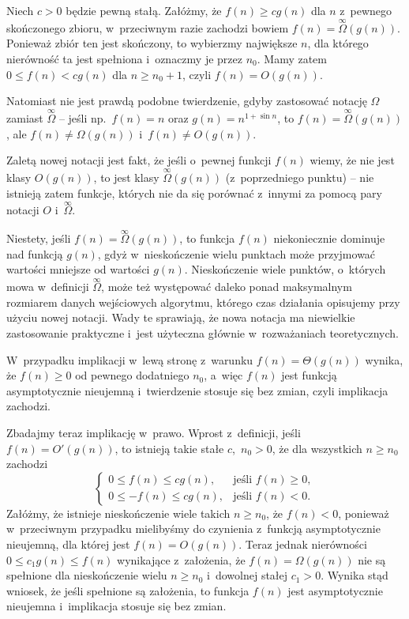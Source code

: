 \subproblem %
Niech $c>0$ będzie pewną stałą. Załóżmy, że $f(n)\ge cg(n)$ dla $n$ z~pewnego skończonego zbioru, w~przeciwnym razie zachodzi bowiem $f(n)=\overset{\infty}{\Omega}(g(n))$. Ponieważ zbiór ten jest skończony, to wybierzmy największe $n$, dla którego nierówność ta jest spełniona i~oznaczmy je przez $n_0$. Mamy zatem $0\le f(n)<cg(n)$ dla $n\ge n_0+1$, czyli $f(n)=O(g(n))$.

Natomiast nie jest prawdą podobne twierdzenie, gdyby zastosować notację $\Omega$ zamiast $\overset{\infty}{\Omega}$ -- jeśli np.\ $f(n)=n$ oraz $g(n)=n^{1+\sin n}$, to $f(n)=\overset{\infty}{\Omega}(g(n))$, ale $f(n)\ne\Omega(g(n))$ i~$f(n)\ne O(g(n))$.

\subproblem %
Zaletą nowej notacji jest fakt, że jeśli o~pewnej funkcji $f(n)$ wiemy, że nie jest klasy $O(g(n))$, to jest klasy $\overset{\infty}{\Omega}(g(n))$ (z~poprzedniego punktu) -- nie istnieją zatem funkcje, których nie da się porównać z~innymi za pomocą pary notacji $O$ i~$\overset{\infty}{\Omega}$.

Niestety, jeśli $f(n)=\overset{\infty}{\Omega}(g(n))$, to funkcja $f(n)$ niekoniecznie dominuje nad funkcją $g(n)$, gdyż w~nieskończenie wielu punktach może przyjmować wartości mniejsze od wartości $g(n)$. Nieskończenie wiele punktów, o~których mowa w~definicji $\overset{\infty}{\Omega}$, może też występować daleko ponad maksymalnym rozmiarem danych wejściowych algorytmu, którego czas działania opisujemy przy użyciu nowej notacji. Wady te sprawiają, że nowa notacja ma niewielkie zastosowanie praktyczne i~jest użyteczna głównie w~rozważaniach teoretycznych.

\subproblem %
W~przypadku implikacji w~lewą stronę z~warunku $f(n)=\Theta(g(n))$ wynika, że $f(n)\ge0$ od pewnego dodatniego $n_0$, a~więc $f(n)$ jest funkcją asymptotycznie nieujemną i~twierdzenie stosuje się bez zmian, czyli implikacja zachodzi.

Zbadajmy teraz implikację w~prawo. Wprost z~definicji, jeśli $f(n)=O'(g(n))$, to istnieją takie stałe $c$,~$n_0>0$, że dla wszystkich $n\ge n_0$ zachodzi
\[
	\begin{cases}
		0 \le f(n) \le cg(n), & \text{jeśli $f(n)\ge0$}, \\
		0 \le -f(n) \le cg(n), & \text{jeśli $f(n)<0$}.
	\end{cases}
\]
Załóżmy, że istnieje nieskończenie wiele takich $n\ge n_0$, że $f(n)<0$, ponieważ w~przeciwnym przypadku mielibyśmy do czynienia z~funkcją asymptotycznie nieujemną, dla której jest $f(n)=O(g(n))$. Teraz jednak nierówności $0\le c_1g(n)\le f(n)$ wynikające z~założenia, że $f(n)=\Omega(g(n))$ nie są spełnione dla nieskończenie wielu $n\ge n_0$ i~dowolnej stałej $c_1>0$. Wynika stąd wniosek, że jeśli spełnione są założenia, to funkcja $f(n)$ jest asymptotycznie nieujemna i~implikacja stosuje się bez zmian.

